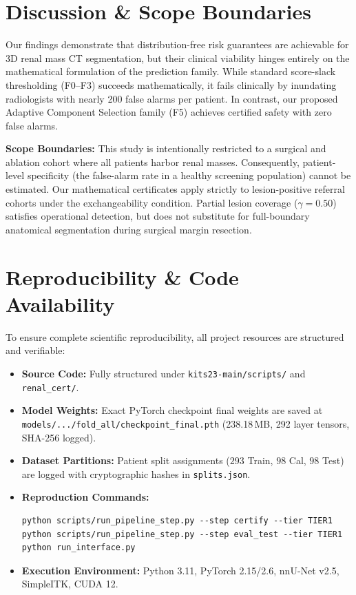 \documentclass[journal,10pt,twocolumn]{IEEEtran}
\begin{document}
\section{Discussion \& Scope Boundaries}
Our findings demonstrate that distribution-free risk guarantees are achievable for 3D renal mass CT segmentation, but their clinical viability hinges entirely on the mathematical formulation of the prediction family. While standard score-slack thresholding (F0--F3) succeeds mathematically, it fails clinically by inundating radiologists with nearly 200 false alarms per patient. In contrast, our proposed Adaptive Component Selection family (F5) achieves certified safety with zero false alarms.

\textbf{Scope Boundaries:} This study is intentionally restricted to a surgical and ablation cohort where all patients harbor renal masses. Consequently, patient-level specificity (the false-alarm rate in a healthy screening population) cannot be estimated. Our mathematical certificates apply strictly to lesion-positive referral cohorts under the exchangeability condition. Partial lesion coverage ($\gamma = 0.50$) satisfies operational detection, but does not substitute for full-boundary anatomical segmentation during surgical margin resection.

\section{Reproducibility \& Code Availability}
To ensure complete scientific reproducibility, all project resources are structured and verifiable:
\begin{itemize}
    \item \textbf{Source Code:} Fully structured under \texttt{kits23-main/scripts/} and \texttt{renal\_cert/}.
    \item \textbf{Model Weights:} Exact PyTorch checkpoint final weights are saved at \texttt{models/.../fold\_all/checkpoint\_final.pth} (238.18\,MB, 292 layer tensors, SHA-256 logged).
    \item \textbf{Dataset Partitions:} Patient split assignments ($293$ Train, $98$ Cal, $98$ Test) are logged with cryptographic hashes in \texttt{splits.json}.
    \item \textbf{Reproduction Commands:}
    \begin{verbatim}
python scripts/run_pipeline_step.py --step certify --tier TIER1
python scripts/run_pipeline_step.py --step eval_test --tier TIER1
python run_interface.py
    \end{verbatim}
    \item \textbf{Execution Environment:} Python 3.11, PyTorch 2.15/2.6, nnU-Net v2.5, SimpleITK, CUDA 12.
\end{itemize}
\end{document}
